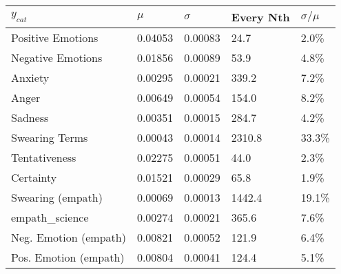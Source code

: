 \begin{tabular}{lllll}
\toprule
$y_{cat}$ &    $\mu$ & $\sigma$ & Every Nth & $\sigma / \mu$ \\
\midrule
Positive Emotions     &  0.04053 &  0.00083 &      24.7 &          2.0\% \\
Negative Emotions     &  0.01856 &  0.00089 &      53.9 &          4.8\% \\
Anxiety               &  0.00295 &  0.00021 &     339.2 &          7.2\% \\
Anger                 &  0.00649 &  0.00054 &     154.0 &          8.2\% \\
Sadness               &  0.00351 &  0.00015 &     284.7 &          4.2\% \\
Swearing Terms        &  0.00043 &  0.00014 &    2310.8 &         33.3\% \\
Tentativeness         &  0.02275 &  0.00051 &      44.0 &          2.3\% \\
Certainty             &  0.01521 &  0.00029 &      65.8 &          1.9\% \\
Swearing (empath)     &  0.00069 &  0.00013 &    1442.4 &         19.1\% \\
empath_science        &  0.00274 &  0.00021 &     365.6 &          7.6\% \\
Neg. Emotion (empath) &  0.00821 &  0.00052 &     121.9 &          6.4\% \\
Pos. Emotion (empath) &  0.00804 &  0.00041 &     124.4 &          5.1\% \\
\bottomrule
\end{tabular}
